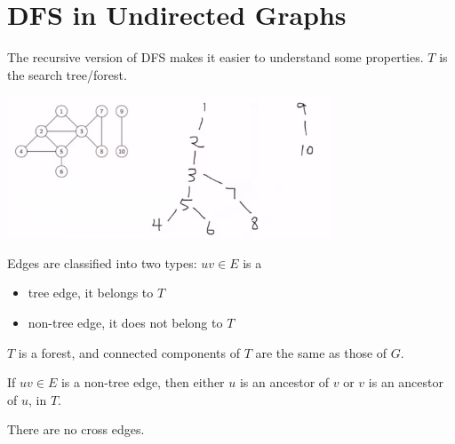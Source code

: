 \documentclass[12pt]{article}
\date{March 25, 2021}
\begin{document}
\maketitle

\section{DFS in Undirected Graphs}
\begin{itemize}
    \item The recursive version of DFS makes it easier to understand some properties. $T$ is the search tree/forest.
    \begin{center}
        \item[] \includegraphics[width=0.725\textwidth]{images/undirected-dfs-tree.jpg}
    \end{center}
    \item[] 
    \item Edges are classified into two types: $uv \in E$ is a
    \begin{itemize}
        \item tree edge, it belongs to $T$
        \item non-tree edge, it does not belong to $T$
    \end{itemize}
    \item $T$ is a forest, and connected components of $T$ are the same as those of $G$.
    \item If $uv \in E$ is a non-tree edge, then either $u$ is an ancestor of $v$ or $v$ is an ancestor of $u$, in $T$.
    \item There are no cross edges.
\end{itemize}
\end{document}
